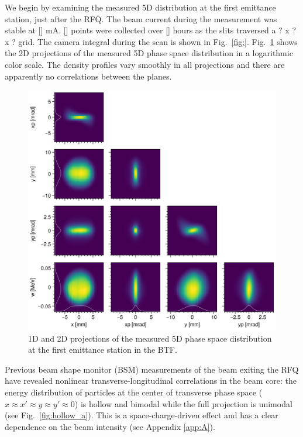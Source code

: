 \documentclass[letterpaper,
               keeplastbox,
               nospread,
               biblatex,
              ]{jacow}
\begin{document}
We begin by examining the measured 5D distribution at the first emittance station, just after the RFQ. The beam current during the measurement was stable at [] mA. [] points were collected over [] hours as the slits traversed a ? x ? x ? grid. The camera integral during the scan is shown in Fig.~\ref{fig:}. Fig.~\ref{fig:VS06_corner} shows the 2D projections of the measured 5D phase space distribution in a logarithmic color scale. The density profiles vary smoothly in all projections and there are apparently no correlations between the planes. 
%
\begin{figure}[!b]
    \centering
    \includegraphics[width=\columnwidth]{VS06_corner.png}
    \caption{1D and 2D projections of the measured 5D phase space distribution at the first emittance station in the BTF.}
    \label{fig:VS06_corner}
\end{figure}
%

Previous beam shape monitor (BSM) measurements of the beam exiting the RFQ have revealed nonlinear transverse-longitudinal correlations in the beam core: the energy distribution of particles at the center of transverse phase space ($x \approx x' \approx y \approx y' \approx 0$) is hollow and bimodal while the full projection is unimodal (see Fig.~\ref{fig:hollow_a}). This is a space-charge-driven effect \cite{Ruisard2021-hollow} and has a clear dependence on the beam intensity (see Appendix \ref{app:A}). 
\end{document}
